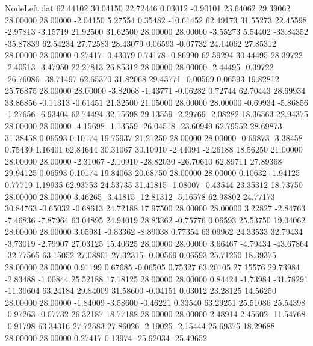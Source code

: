 \begin{filecontents}{NodeLeft.dat}
  62.44102   30.04150   22.72446     0.03012   -0.90101   23.64062   29.39062   28.00000   28.00000   -2.04150    5.27554    0.35482  -10.61452
  62.49173   31.55273   22.45598    -2.97813   -3.15719   21.92500   31.62500   28.00000   28.00000   -3.55273    5.54402  -33.84352  -35.87839
  62.54234   27.72583   28.43079     0.06593   -0.07732   24.14062   27.85312   28.00000   28.00000    0.27417   -0.43079    0.74178   -0.86990
  62.59294   30.44495   28.39722    -2.40513   -3.47950   22.27813   26.85312   28.00000   28.00000   -2.44495   -0.39722  -26.76086  -38.71497
  62.65370   31.82068   29.43771    -0.00569    0.06593   19.82812   25.76875   28.00000   28.00000   -3.82068   -1.43771   -0.06282    0.72744
  62.70443   28.69934   33.86856    -0.11313   -0.61451   21.32500   21.05000   28.00000   28.00000   -0.69934   -5.86856   -1.27656   -6.93404
  62.74494   32.15698   29.13559    -2.29769   -2.08282   18.36563   22.94375   28.00000   28.00000   -4.15698   -1.13559  -26.04518  -23.60949
  62.79552   28.69873   31.38458     0.06593    0.10174   19.75937   21.21250   28.00000   28.00000   -0.69873   -3.38458    0.75430    1.16401
  62.84644   30.31067   30.10910    -2.44094   -2.26188   18.56250   21.00000   28.00000   28.00000   -2.31067   -2.10910  -28.82030  -26.70610
  62.89711   27.89368   29.94125     0.06593    0.10174   19.84063   20.68750   28.00000   28.00000    0.10632   -1.94125    0.77719    1.19935
  62.93753   24.53735   31.41815    -1.08007   -0.43544   23.35312   18.73750   28.00000   28.00000    3.46265   -3.41815  -12.81312   -5.16578
  62.98802   24.77173   30.84763    -0.65032   -0.68613   24.72188   17.97500   28.00000   28.00000    3.22827   -2.84763   -7.46836   -7.87964
  63.04895   24.94019   28.83362    -0.75776    0.06593   25.53750   19.04062   28.00000   28.00000    3.05981   -0.83362   -8.89038    0.77354
  63.09962   24.33533   32.79434    -3.73019   -2.79907   27.03125   15.40625   28.00000   28.00000    3.66467   -4.79434  -43.67864  -32.77565
  63.15052   27.08801   27.32315    -0.00569    0.06593   25.71250   18.39375   28.00000   28.00000    0.91199    0.67685   -0.06505    0.75327
  63.20105   27.15576   29.73984    -2.83488   -1.00844   25.52188   17.18125   28.00000   28.00000    0.84424   -1.73984  -31.78291  -11.30604
  63.24184   29.84009   31.58600    -0.04151    0.03012   23.28125   14.56250   28.00000   28.00000   -1.84009   -3.58600   -0.46221    0.33540
  63.29251   25.51086   25.54398    -0.97263   -0.07732   26.32187   18.77188   28.00000   28.00000    2.48914    2.45602  -11.54768   -0.91798
  63.34316   27.72583   27.86026    -2.19025   -2.15444   25.69375   18.29688   28.00000   28.00000    0.27417    0.13974  -25.92034  -25.49652

\end{filecontents}
